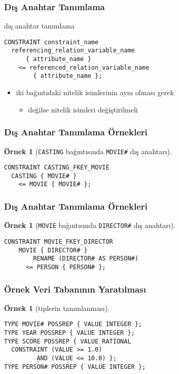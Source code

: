 \documentclass[dvipsnames]{beamer}
\theoremstyle{definition}
\theoremstyle{example}
\newtheorem{ornek}[theorem]{Örnek}
\theoremstyle{plain}
\begin{document}
\begin{frame}[fragile]
  \frametitle{Dış Anahtar Tanımlama}

  \begin{block}{dış anahtar tanımlama}
    \begin{lstlisting}
CONSTRAINT constraint_name
  referencing_relation_variable_name
      { attribute_name }
    <= referenced_relation_variable_name
        { attribute_name };
    \end{lstlisting}
  \end{block}

  \begin{itemize}
    \item iki bağıntıdaki nitelik isimlerinin aynı olması gerek
    \begin{itemize}
      \item değilse nitelik isimleri değiştirilmeli
    \end{itemize}
  \end{itemize}
\end{frame}

\begin{frame}[fragile]
  \frametitle{Dış Anahtar Tanımlama Örnekleri}

  \begin{ornek}[\texttt{CASTING} bağıntısında \texttt{MOVIE\#} dış anahtarı]
    \begin{lstlisting}
CONSTRAINT CASTING_FKEY_MOVIE
  CASTING { MOVIE# }
    <= MOVIE { MOVIE# };
    \end{lstlisting}
  \end{ornek}
\end{frame}

\begin{frame}[fragile]
  \frametitle{Dış Anahtar Tanımlama Örnekleri}

  \begin{ornek}[\texttt{MOVIE} bağıntısında \texttt{DIRECTOR\#} dış anahtarı]
    \begin{lstlisting}
CONSTRAINT MOVIE_FKEY_DIRECTOR
    MOVIE { DIRECTOR# }
        RENAME (DIRECTOR# AS PERSON#)
      <= PERSON { PERSON# };
    \end{lstlisting}
  \end{ornek}
\end{frame}

\begin{frame}[fragile]
  \frametitle{Örnek Veri Tabanının Yaratılması}

  \begin{ornek}[tiplerin tanımlanması]
    \begin{lstlisting}
TYPE MOVIE# POSSREP { VALUE INTEGER };
TYPE YEAR POSSREP { VALUE INTEGER };
TYPE SCORE POSSREP { VALUE RATIONAL
  CONSTRAINT (VALUE >= 1.0)
         AND (VALUE <= 10.0) };
TYPE PERSON# POSSREP { VALUE INTEGER };
    \end{lstlisting}
  \end{ornek}
\end{frame}
\end{document}
